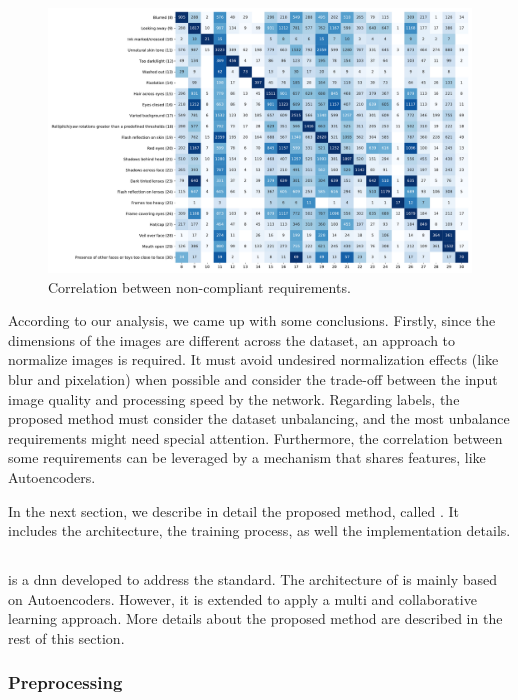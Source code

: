 \begin{figure}
    \centering
    \includegraphics[width=\linewidth]{images/reqs_correlation.pdf}
    \caption{Correlation between non-compliant requirements.}
    \label{fig:reqs_correlation}
\end{figure}

According to our analysis, we came up with some conclusions. Firstly, since the dimensions of the images are different across the dataset, an approach to normalize images is required. It must avoid undesired normalization effects (like blur and pixelation) when possible and consider the trade-off between the input image quality and processing speed by the network. Regarding labels, the proposed method must consider the dataset unbalancing, and the most unbalance requirements might need special attention. Furthermore, the correlation between some requirements can be leveraged by a mechanism that shares features, like Autoencoders.

In the next section, we describe in detail the proposed method, called \methodname. It includes the architecture, the training process, as well the implementation details.

\subsection{\methodname}

\methodname is a \acl{dnn} developed to address the \icao standard. The architecture of \methodname is mainly based on Autoencoders. However, it is extended to apply a multi and collaborative learning approach. More details about the proposed method are described in the rest of this section. 

\subsubsection{Preprocessing} \label{sec:preprocessing}

